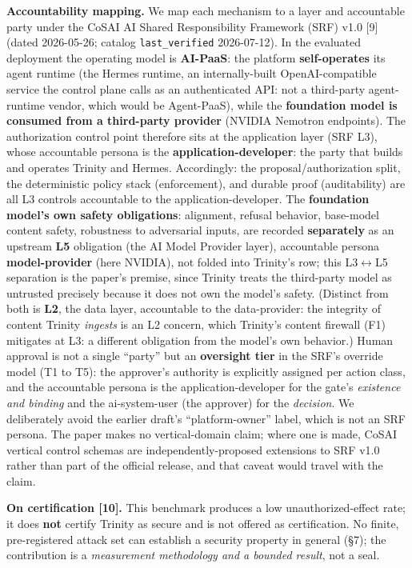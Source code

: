 \documentclass[11pt]{article}
\begin{document}
\textbf{Accountability mapping.} We map each mechanism to a layer and accountable party under the
CoSAI AI Shared Responsibility Framework (SRF) v1.0 {[}9{]} (dated 2026-05-26; catalog \texttt{last\_verified}
2026-07-12). In the evaluated deployment the operating model is \textbf{AI-PaaS}: the platform
\textbf{self-operates} its agent runtime (the Hermes runtime, an internally-built OpenAI-compatible
service the control plane calls as an authenticated API: not a third-party agent-runtime
vendor, which would be Agent-PaaS), while the \textbf{foundation model is consumed from a
third-party provider} (NVIDIA Nemotron endpoints). The authorization control point therefore
sits at the application layer (SRF L3), whose accountable persona is the \textbf{application-developer}: the party that builds and operates Trinity and Hermes. Accordingly: the proposal/authorization
split, the deterministic policy stack (enforcement), and durable proof (auditability) are all
L3 controls accountable to the application-developer. The \textbf{foundation model's own safety
obligations}: alignment, refusal behavior, base-model content safety, robustness to
adversarial inputs, are recorded \textbf{separately} as an upstream \textbf{L5} obligation (the AI
Model Provider layer), accountable persona \textbf{model-provider} (here NVIDIA), not folded into
Trinity's row; this L3$\leftrightarrow$L5 separation is the paper's premise, since Trinity
treats the third-party model as untrusted precisely because it does not own the model's
safety. (Distinct from both is \textbf{L2}, the data layer, accountable to the data-provider: the
integrity of content Trinity \emph{ingests} is an L2 concern, which Trinity's content firewall (F1)
mitigates at L3: a different obligation from the model's own behavior.) Human
approval is not a single ``party'' but an \textbf{oversight tier} in the SRF's override model
(T1 to T5): the approver's authority is explicitly assigned per action class, and the accountable
persona is the application-developer for the gate's \emph{existence and binding} and the
ai-system-user (the approver) for the \emph{decision}. We deliberately avoid the earlier draft's
``platform-owner'' label, which is not an SRF persona. The paper makes no vertical-domain claim; where one is made, CoSAI vertical control schemas are
independently-proposed extensions to SRF v1.0 rather than part of the official release, and
that caveat would travel with the claim.

\textbf{On certification {[}10{]}.} This benchmark produces a low unauthorized-effect
rate; it does \textbf{not} certify Trinity as secure and is not offered as certification. No
finite, pre-registered attack set can establish a security property in general (\S7); the
contribution is a \emph{measurement methodology and a bounded result}, not a seal.
\end{document}
